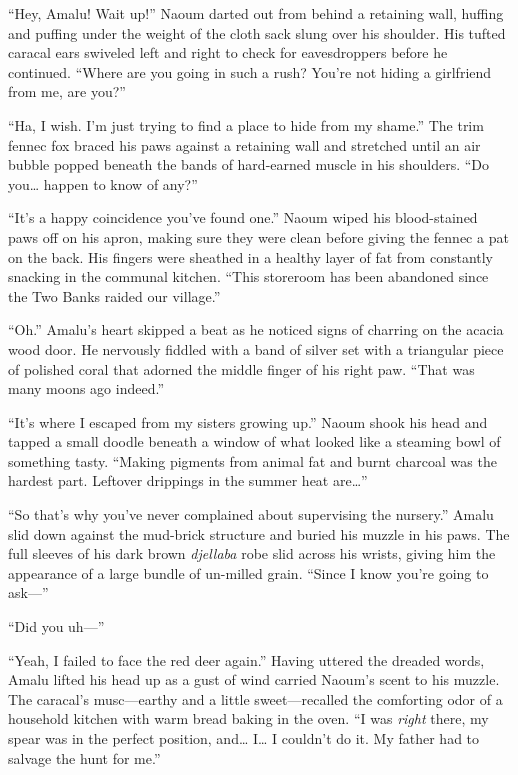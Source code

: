 ``Hey, Amalu! Wait up!'' Naoum darted out from behind a retaining wall, huffing and puffing under the weight of the cloth sack slung over his shoulder. His tufted caracal ears swiveled left and right to check for eavesdroppers before he continued. ``Where are you going in such a rush? You're not hiding a girlfriend from me, are you?''

``Ha, I wish. I'm just trying to find a place to hide from my shame.'' The trim fennec fox braced his paws against a retaining wall and stretched until an air bubble popped beneath the bands of hard-earned muscle in his shoulders. ``Do you\ldots{} happen to know of any?''

``It's a happy coincidence you've found one.'' Naoum wiped his blood-stained paws off on his apron, making sure they were clean before giving the fennec a pat on the back. His fingers were sheathed in a healthy layer of fat from constantly snacking in the communal kitchen. ``This storeroom has been abandoned since the Two Banks raided our village.''

``Oh.'' Amalu's heart skipped a beat as he noticed signs of charring on the acacia wood door. He nervously fiddled with a band of silver set with a triangular piece of polished coral that adorned the middle finger of his right paw. ``That was many moons ago indeed.''

``It's where I escaped from my sisters growing up.'' Naoum shook his head and tapped a small doodle beneath a window of what looked like a steaming bowl of something tasty. ``Making pigments from animal fat and burnt charcoal was the hardest part. Leftover drippings in the summer heat are\ldots''

``So that's why you've never complained about supervising the nursery.'' Amalu slid down against the mud-brick structure and buried his muzzle in his paws. The full sleeves of his dark brown \emph{djellaba} robe slid across his wrists, giving him the appearance of a large bundle of un-milled grain. ``Since I know you're going to \mbox{ask---''}

``Did you uh---''

``Yeah, I failed to face the red deer again.'' Having uttered the dreaded words, Amalu lifted his head up as a gust of wind carried Naoum's scent to his muzzle. The caracal's musc---earthy and a little sweet---recalled the comforting odor of a household kitchen with warm bread baking in the oven. ``I was \emph{right} there, my spear was in the perfect position, and\ldots{} I\ldots{} I couldn't do it. My father had to salvage the hunt for me.''


